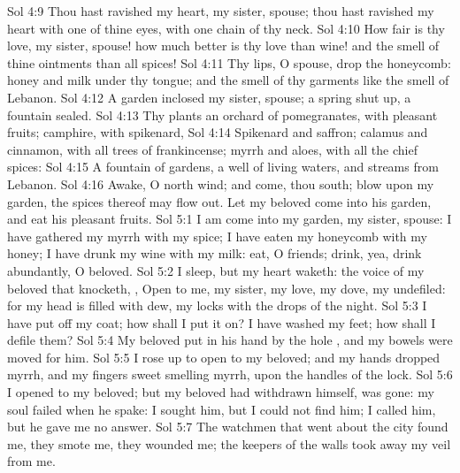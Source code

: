\vs Sol 4:9 Thou hast ravished my heart, my sister,  spouse; thou hast ravished my heart with one of thine eyes, with one chain of thy neck.
\vs Sol 4:10 How fair is thy love, my sister,  spouse! how much better is thy love than wine! and the smell of thine ointments than all spices!
\vs Sol 4:11 Thy lips, O  spouse, drop  the honeycomb: honey and milk  under thy tongue; and the smell of thy garments  like the smell of Lebanon.
\vs Sol 4:12 A garden inclosed  my sister,  spouse; a spring shut up, a fountain sealed.
\vs Sol 4:13 Thy plants  an orchard of pomegranates, with pleasant fruits; camphire, with spikenard,
\vs Sol 4:14 Spikenard and saffron; calamus and cinnamon, with all trees of frankincense; myrrh and aloes, with all the chief spices:
\vs Sol 4:15 A fountain of gardens, a well of living waters, and streams from Lebanon.
\vs Sol 4:16 Awake, O north wind; and come, thou south; blow upon my garden,  the spices thereof may flow out. Let my beloved come into his garden, and eat his pleasant fruits.
\vs Sol 5:1 I am come into my garden, my sister,  spouse: I have gathered my myrrh with my spice; I have eaten my honeycomb with my honey; I have drunk my wine with my milk: eat, O friends; drink, yea, drink abundantly, O beloved.
\vs Sol 5:2 I sleep, but my heart waketh:  the voice of my beloved that knocketh, , Open to me, my sister, my love, my dove, my undefiled: for my head is filled with dew,  my locks with the drops of the night.
\vs Sol 5:3 I have put off my coat; how shall I put it on? I have washed my feet; how shall I defile them?
\vs Sol 5:4 My beloved put in his hand by the hole , and my bowels were moved for him.
\vs Sol 5:5 I rose up to open to my beloved; and my hands dropped  myrrh, and my fingers  sweet smelling myrrh, upon the handles of the lock.
\vs Sol 5:6 I opened to my beloved; but my beloved had withdrawn himself,  was gone: my soul failed when he spake: I sought him, but I could not find him; I called him, but he gave me no answer.
\vs Sol 5:7 The watchmen that went about the city found me, they smote me, they wounded me; the keepers of the walls took away my veil from me.
